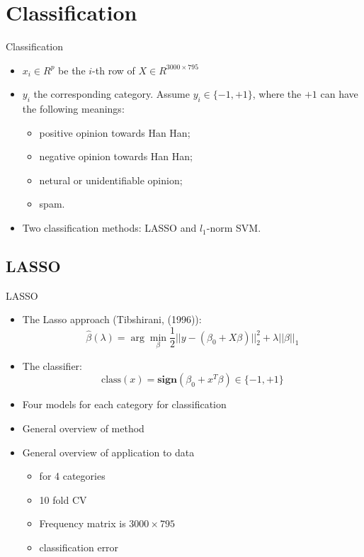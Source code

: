 \documentclass[12pt, trans]{beamer}
\newcommand{\1}[1]{{\mathbf 1}\left\{#1\right\}}        %
\begin{document}
\clearpage 
\section{Classification}

\begin{frame}{Classification}


\begin{itemize}[<+->]


\item $x_i\in R^{p}$ be the $i$-th row of $X\in R^{3000\times795}$
\item $y_i$ the corresponding category. Assume $y_i\in\{-1,+1\}$, where the $+1$ can have the following meanings:
  \begin{itemize}[<+->]
    \item positive opinion towards Han Han; 
    \item negative opinion towards Han Han; 
    \item netural or unidentifiable opinion; 
    \item spam. 
\end{itemize}
\item Two classification methods: LASSO and $l_1$-norm SVM.
\end{itemize}
\end{frame}
\subsection{LASSO}

\begin{frame}[fragile]{LASSO}
\begin{itemize}[<+->]

\item The Lasso approach (Tibshirani, (1996)):
\[
\hat{\beta}(\lambda) = \arg \min_\beta \frac{1}{2}||y-(\beta_0+X\beta)||_2^2 + \lambda ||\beta||_1
\]
\item The classifier:
\[
\text{class}(x) = \textbf{sign}(\beta_0+x^T\beta)\in\{-1,+1\}
\]

\item Four models for each category for classification
\item General overview of method
\item General overview of application to data
	\begin{itemize}
	\item for 4 categories
	\item 10 fold CV
	\item Frequency matrix is $3000 \times 795$
	\item classification error
	\end{itemize}
	
\end{itemize}

\end{frame}
\end{document}
